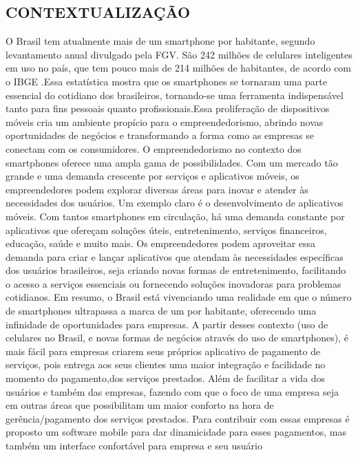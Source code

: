 \documentclass[a4paper,12pt]{article}
\begin{document}
\subsection{CONTEXTUALIZAÇÃO}
O Brasil tem atualmente mais de um smartphone por habitante, segundo levantamento anual divulgado pela FGV. São 242 milhões de celulares inteligentes em uso no país, que tem pouco mais de 214 milhões de habitantes, de acordo com o IBGE
\cite{celulares}.Essa estatística mostra que os smartphones se tornaram uma parte essencial do cotidiano dos brasileiros, tornando-se uma ferramenta indispensável tanto para fins pessoais quanto profissionais.Essa proliferação de dispositivos móveis cria um ambiente propício para o empreendedorismo, abrindo novas oportunidades de negócios e transformando a forma como as empresas se conectam com os consumidores.
\newline O empreendedorismo no contexto dos smartphones oferece uma ampla gama de possibilidades. Com um mercado tão grande e uma demanda crescente por serviços e aplicativos móveis, os empreendedores podem explorar diversas áreas para inovar e atender às necessidades dos usuários.
Um exemplo claro é o desenvolvimento de aplicativos móveis. Com tantos smartphones em circulação, há uma demanda constante por aplicativos que ofereçam soluções úteis, entretenimento, serviços financeiros, educação, saúde e muito mais. Os empreendedores podem aproveitar essa demanda para criar e lançar aplicativos que atendam às necessidades específicas dos usuários brasileiros, seja criando novas formas de entretenimento, facilitando o acesso a serviços essenciais ou fornecendo soluções inovadoras para problemas cotidianos.
Em resumo, o Brasil está vivenciando uma realidade em que o número de smartphones ultrapassa a marca de um por habitante, oferecendo uma infinidade de oportunidades para empresas.
\newline A partir desses contexto (uso de celulares no Brasil, e novas formas de negócios através do uso de smartphones), é mais fácil para empresas criarem seus próprios aplicativo de pagamento de serviços, pois
entrega aos seus clientes uma maior integração e facilidade no momento do pagamento,dos
serviços prestados. Além de facilitar a vida dos usuários e também das empresas, fazendo
com que o foco de uma empresa seja em outras áreas que possibilitam um maior conforto
na hora de gerência/pagamento dos serviços prestados. Para contribuir com essas empresas é proposto um software mobile para dar dinamicidade para esses pagamentos, mas também um interface confortável para empresa e seu usuário
\end{document}
